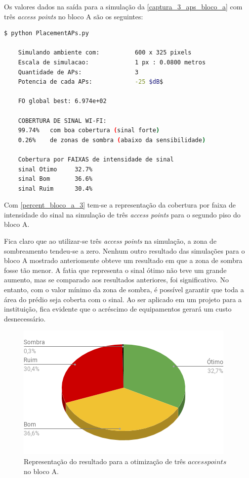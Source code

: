 \documentclass[
	12pt,				%
	twoside,			%
	a4paper,			%
	english,			%
	french,				%
	spanish,			%
	brazil				%
	]{abntex2}
\begin{document}
Os valores dados na saída para a simulação da
\autoref{captura_3_aps_bloco_a} com três \emph{access points} no bloco A
são os seguintes:

\begin{lstlisting}[language=bash]
    $ python PlacementAPs.py 
    
    Simulando ambiente com:          600 x 325 pixels
    Escala de simulacao:             1 px : 0.0800 metros
    Quantidade de APs:               3
    Potencia de cada APs:            -25 $dB$
    
    FO global best: 6.974e+02
    
    COBERTURA DE SINAL WI-FI:
    99.74%   com boa cobertura (sinal forte)
    0.26%    de zonas de sombra (abaixo da sensibilidade)
    
    Cobertura por FAIXAS de intensidade de sinal
    sinal Otimo     32.7%
    sinal Bom       36.6%
    sinal Ruim      30.4%
\end{lstlisting}

Com \autoref{percent_bloco_a_3} tem-se a representação da cobertura por
faixa de intensidade do sinal na simulação de três \emph{access points}
para o segundo piso do bloco A.

Fica claro que ao utilizar-se três \emph{access points} na simulação, a
zona de sombreamento tendeu-se a zero. Nenhum outro resultado das
simulações para o bloco A mostrado anteriomente obteve um resultado em
que a zona de sombra fosse tão menor. A fatia que representa o sinal
ótimo não teve um grande aumento, mas se comparado aos resultados
anteriores, foi significativo. No entanto, com o valor mínimo da zona de
sombra, é possível garantir que toda a área do prédio seja coberta com o
sinal. Ao ser aplicado em um projeto para a instituição, fica evidente
que o acréscimo de equipamentos gerará um custo desnecessário.

\begin{figure}[ht]
    \caption{\label{percent_bloco_a_3} Representação do resultado para a otimização 
     de três $access points$ no bloco A.}
    \begin{center}
        \includegraphics[scale=0.7]{imagens/percent-bloco-a-3.png}
    \end{center}
\end{figure}
\end{document}
